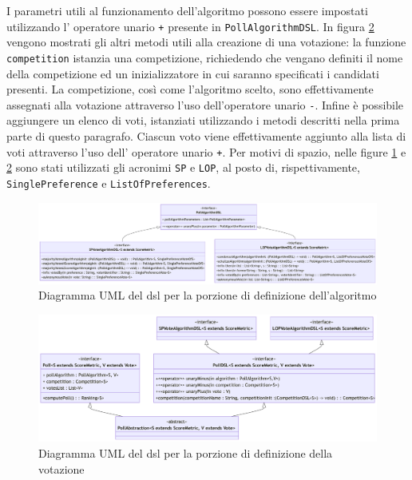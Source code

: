 \documentclass[12pt,a4paper,openright,twoside]{book}
\begin{document}
I parametri utili al funzionamento dell'algoritmo possono essere impostati utilizzando l'
operatore unario \texttt{+} presente in \texttt{PollAlgorithmDSL}.
In figura \ref{fig:pollDSL} vengono mostrati gli altri metodi utili alla creazione di una votazione:
la funzione \texttt{competition} istanzia una competizione,
richiedendo che vengano definiti il nome della competizione ed un inizializzatore in cui saranno specificati i candidati presenti.
La competizione, così come l'algoritmo scelto, sono effettivamente assegnati alla votazione
attraverso l'uso dell'operatore unario \texttt{-}.
Infine è possibile aggiungere un elenco di voti, istanziati utilizzando i metodi descritti nella prima parte
di questo paragrafo. Ciascun voto viene effettivamente aggiunto alla lista di voti attraverso
l'uso dell' operatore unario \texttt{+}.
Per motivi di spazio, nelle figure \ref{fig:pollAlgorithmDSL} e \ref{fig:pollDSL} sono stati utilizzati gli
acronimi \texttt{SP} e \texttt{LOP}, al posto di, rispettivamente, \texttt{SinglePreference} e \texttt{ListOfPreferences}.

 \vfill
 \begin{center} 
 \begin{figure}[H]
     \centering
      \includegraphics[width=1.1\linewidth]{figures/pollAlgorithmDSL.pdf}
      \caption{Diagramma UML del \ac{dsl} per la porzione di definizione dell'algoritmo}
     \label{fig:pollAlgorithmDSL}
  \end{figure}
\end{center}
\vfill



\vfill
\begin{center}
 \begin{figure}[H]
     \centering
      \includegraphics[width=1.1\linewidth]{figures/pollDSL.pdf}
      \caption{Diagramma UML del \ac{dsl} per la porzione di definizione della votazione}
     \label{fig:pollDSL}
  \end{figure}
\end{center}
\vfill
  
\end{document}

